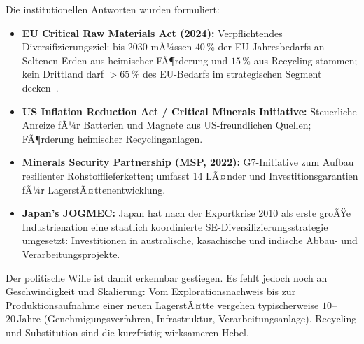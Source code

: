 ﻿\documentclass[12pt, a4paper]{report}
\theoremstyle{definition}
\theoremstyle{remark}
\begin{document}
Die institutionellen Antworten wurden formuliert:
\begin{itemize}
  \item \textbf{EU Critical Raw Materials Act (2024):} Verpflichtendes
        Diversifizierungsziel: bis 2030 mÃ¼ssen $40\,\%$ der EU-Jahresbedarfs
        an Seltenen Erden aus heimischer FÃ¶rderung und $15\,\%$ aus Recycling
        stammen; kein Drittland darf $>65\,\%$ des EU-Bedarfs im strategischen
        Segment decken~\cite{eu2023}.
  \item \textbf{US Inflation Reduction Act / Critical Minerals Initiative:}
        Steuerliche Anreize fÃ¼r Batterien und Magnete aus US-freundlichen
        Quellen; FÃ¶rderung heimischer Recyclinganlagen.
  \item \textbf{Minerals Security Partnership (MSP, 2022):} G7-Initiative
        zum Aufbau resilienter Rohstofflieferketten; umfasst 14 LÃ¤nder
        und Investitionsgarantien fÃ¼r LagerstÃ¤ttenentwicklung.
  \item \textbf{Japan's JOGMEC:} Japan hat nach der Exportkrise 2010 als
        erste groÃŸe Industrienation eine staatlich koordinierte
        SE-Diversifizierungsstrategie umgesetzt: Investitionen in
        australische, kasachische und indische Abbau- und
        Verarbeitungsprojekte.
\end{itemize}

Der politische Wille ist damit erkennbar gestiegen. Es fehlt jedoch noch an
Geschwindigkeit und Skalierung: Vom Explorationsnachweis bis zur
Produktionsaufnahme einer neuen LagerstÃ¤tte vergehen typischerweise
$10$--$20\,\text{Jahre}$ (Genehmigungsverfahren, Infrastruktur,
Verarbeitungsanlage). Recycling und Substitution sind die kurzfristig
wirksameren Hebel.
\end{document}
